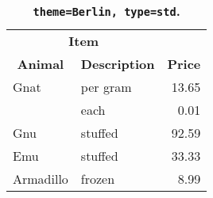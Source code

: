 \begin{table}[!htb]
\large
\centering
\begin{tabular}{|l|l|r|}
\hline
\multicolumn{2}{|c|}{\textbf{Item}}   & \multicolumn{1}{c|}{\textbf{}}            \\
\multicolumn{1}{|c|}{\textbf{Animal}} & \multicolumn{1}{c|}{\textbf{Description}} & \multicolumn{1}{c|}{\textbf{Price}} \\
\hline
\hline
Gnat      & per gram & 13.65 \\
          & each     & 0.01  \\
Gnu       & stuffed  & 92.59 \\
Emu       & stuffed  & 33.33 \\
Armadillo & frozen   & 8.99  \\
\hline
\end{tabular}
\caption[\texttt{theme=Berlin, type=std}]{\textbf{\texttt{theme=Berlin, type=std}. }}
\end{table}
